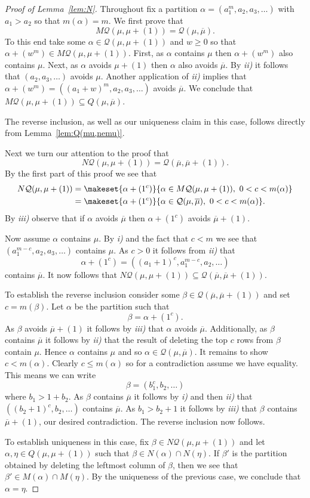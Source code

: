 \documentclass{article}
\theoremstyle{plain}
\theoremstyle{definition}
\newcommand{\Q}{\mathcal{Q}}
\renewcommand{\ne}[1]{\overline{#1}}
\begin{document}
\begin{proof}[Proof of Lemma~\ref{lem:N}]
Throughout fix a partition $\alpha = (a_1^m, a_2, a_3,\ldots)$  with $a_1>a_2$ so that $m(\alpha) = m$.  We first prove that
$$M\Q(\mu,\mu+(1)) =  \Q(\mu,\ne\mu).$$
To this end take some $\alpha\in \Q(\mu,\mu+(1))$ and $w\geq 0$ so that $\alpha + (w^m)\in M\Q(\mu,\mu+(1))$.  First, as $\alpha$ contains $\mu$ then $\alpha+(w^m)$ also contains $\mu$.   Next, as $\alpha$ avoids $\mu+(1)$ then $\alpha$ also avoids $\ne\mu$.  By \emph{ii)} it follows that $(a_2,a_3,\ldots)$ avoids $\mu$.  Another application of \emph{ii)}  implies that  $\alpha+(w^m) = ( (a_1+w)^m, a_2,a_3,\ldots)$ avoids $\ne\mu$. We conclude that $M\Q(\mu,\mu+(1))\subseteq Q(\mu,\ne\mu)$.  

The reverse inclusion, as well as our uniqueness claim in this case, follows directly from Lemma~\ref{lem:Q(mu,nemu)}.

\medskip

Next we turn our attention to the proof that 
$$N\Q(\mu,\mu+(1)) =  \Q(\ne\mu,\ne\mu+(1)).$$
By the first part of this proof we see that
\begin{align*}
    N\Q(\mu,\mu+(1)) &=\makeset{\alpha+(1^c)}{\alpha\in M\Q(\mu,\mu+(1)),\ 0<c<m(\alpha)}\\
    &= \makeset{\alpha+(1^c)}{\alpha\in \Q(\mu,\ne\mu),\  0<c<m(\alpha)}.
\end{align*}
By \emph{iii)} observe that if $\alpha$ avoids $\ne\mu$ then $\alpha+(1^c)$ avoids $\ne\mu +(1)$.  

Now assume $\alpha$ contains $\mu$.  By \emph{i)} and the fact that $c<m$ we see that $(a_1^{m-c}, a_2,a_3,\ldots)$
contains $\mu$.  As $c>0$ it follows from \emph{ii)} that 
$$\alpha+(1^c) = ( (a_1+1)^c, a_1^{m-c}, a_2,\ldots)$$
contains $\ne\mu$.  It now follows that $N\Q(\mu,\mu+(1)) \subseteq \Q(\ne\mu, \ne\mu+(1))$.  
 
 To establish the reverse inclusion consider some $\beta\in \Q(\ne\mu,\ne\mu+(1))$ and set $c = m(\beta)$.  Let $\alpha$ be the partition such that 
 $$\beta = \alpha+(1^c).$$  
 As $\beta$ avoids $\ne\mu+(1)$ it follows by \emph{iii)} that $\alpha$ avoids $\ne\mu$.   Additionally, as $\beta$ contains $\ne\mu$ it follows by \emph{ii)} that the result of deleting the top $c$ rows from $\beta$ contain $\mu$.  Hence $\alpha$ contains $\mu$ and so $\alpha\in \Q(\mu,\ne\mu)$.  It remains to show  $c<m(\alpha)$.  Clearly $c\leq m(\alpha)$ so for a contradiction assume we have equality. This means  we can write
 $$\beta = (b_1^c, b_2,\ldots)$$
 where $b_1> 1+ b_2$.  As $\beta$ contains $\ne\mu$ it follows by \emph{i)} and then \emph{ii)} that $((b_2+1)^c,b_2,\ldots)$ contains $\ne\mu$.  As $b_1> b_2+1$ it follows by \emph{iii)} that $\beta$ contains $\ne\mu+(1)$, our desired contradiction.  The reverse inclusion now follows. 

To establish uniqueness in this case, fix $\beta \in N\Q(\mu, \mu +(1))$ and let $\alpha, \eta \in Q(\mu,\mu+(1))$ such that $\beta \in N(\alpha)\cap N(\eta )$.  If $\beta'$ is the partition obtained by deleting the leftmost column of $\beta$, then we see that $\beta' \in M(\alpha)\cap M(\eta )$.  By the uniqueness of the previous case, we conclude that $\alpha = \eta $.  
\end{proof}
\end{document}

